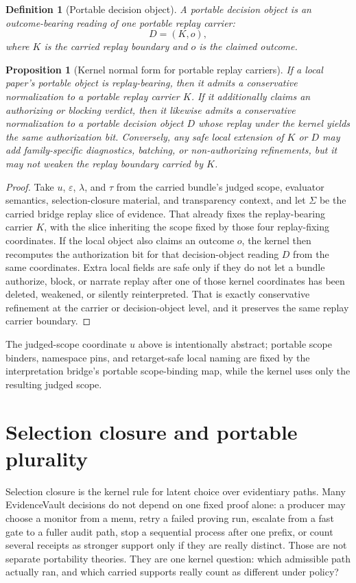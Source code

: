 \documentclass[11pt]{article}
\newtheorem{definition}{Definition}
\newtheorem{proposition}{Proposition}
\theoremstyle{remark}
\begin{document}
\begin{definition}[Portable decision object]
A portable decision object is an outcome-bearing reading of one portable replay carrier:
\[
D=(K,o),
\]
where $K$ is the carried replay boundary and $o$ is the claimed outcome.
\end{definition}

\begin{proposition}[Kernel normal form for portable replay carriers]
If a local paper's portable object is replay-bearing, then it admits a conservative normalization to a portable replay carrier $K$.
If it additionally claims an authorizing or blocking verdict, then it likewise admits a conservative normalization to a portable decision object $D$ whose replay under the kernel yields the same authorization bit.
Conversely, any safe local extension of $K$ or $D$ may add family-specific diagnostics, batching, or non-authorizing refinements,
but it may not weaken the replay boundary carried by $K$.
\end{proposition}

\begin{proof}
Take $u$, $\varepsilon$, $\lambda$, and $\tau$ from the carried bundle's judged scope, evaluator semantics, selection-closure material, and
transparency context, and let $\Sigma$ be the carried bridge replay slice of evidence.
That already fixes the replay-bearing carrier $K$, with the slice inheriting the scope fixed by those four replay-fixing coordinates.
If the local object also claims an outcome $o$, the kernel then recomputes the authorization bit for that decision-object reading $D$ from the same coordinates.
Extra local fields are safe only if they do not let a bundle authorize, block, or narrate replay after one of those kernel coordinates has been deleted,
weakened, or silently reinterpreted.
That is exactly conservative refinement at the carrier or decision-object level, and it preserves the same replay carrier boundary.
\end{proof}

The judged-scope coordinate $u$ above is intentionally abstract; portable scope binders, namespace pins, and retarget-safe local naming are fixed by the interpretation bridge's portable scope-binding map, while the kernel uses only the resulting judged scope.


\section{Selection closure and portable plurality}
Selection closure is the kernel rule for latent choice over evidentiary paths.
Many EvidenceVault decisions do not depend on one fixed proof alone: a producer may choose a monitor from a menu, retry a failed proving run, escalate from a fast gate to a fuller audit path, stop a sequential process after one prefix, or count several receipts as stronger support only if they are really distinct.
Those are not separate portability theories. They are one kernel question: which admissible path actually ran, and which carried supports really count as different under policy?
\end{document}
